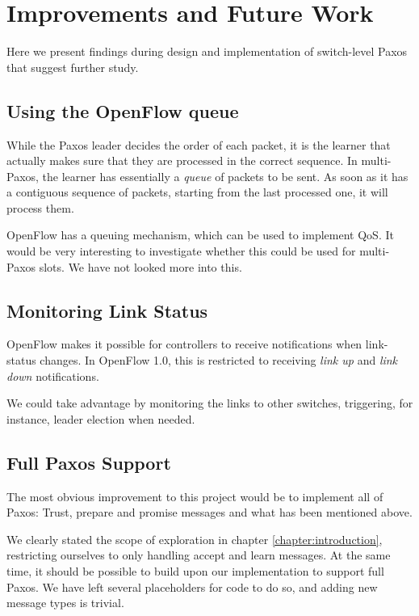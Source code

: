 \chapter{Improvements and Future Work}

Here we present findings during design and implementation of switch-level
Paxos that suggest further study.

\section{Using the OpenFlow queue}

While the Paxos leader decides the order of each packet, it is the learner
that actually makes sure that they are processed in the correct sequence.
%
In multi-Paxos, the learner has essentially a \textit{queue} of packets to
be sent.  As soon as it has a contiguous sequence of packets, starting from
the last processed one, it will process them.

OpenFlow has a queuing mechanism, which can be used to implement \ac{QoS}.
It would be very interesting to investigate whether this could be used for
multi-Paxos slots.  We have not looked more into this.

\section{Monitoring Link Status}

OpenFlow makes it possible for controllers to receive notifications when
link-status changes.  In OpenFlow 1.0, this is restricted
to receiving \textit{link up} and \textit{link down}
notifications.

We could take advantage by monitoring the links to other switches,
triggering, for instance, leader election when needed.

\section{Full Paxos Support}

The most obvious improvement to this project would be to implement all of
Paxos: Trust, prepare and
promise messages and what has been mentioned above.

We clearly stated the scope of exploration in chapter
\ref{chapter:introduction}, restricting ourselves to only handling accept
and learn messages.  At the same time, it should be possible to build upon
our implementation to support full Paxos.  We have left several placeholders
for code to do so, and adding new message types is trivial.
